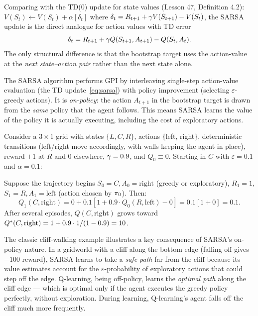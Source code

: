 \documentclass[11pt,a4paper]{article}
\begin{document}
\begin{remark}
\label{rem:sarsa_td}
Comparing with the TD(0) update for state values
(Lesson 47, Definition 4.2):
$V(S_t) \leftarrow V(S_t) + \alpha[\delta_t]$ where
$\delta_t = R_{t+1} + \gamma V(S_{t+1}) - V(S_t)$,
the SARSA update is the direct analogue for action values with
TD error
\begin{equation}
  \delta_t = R_{t+1} + \gamma Q(S_{t+1}, A_{t+1})
  - Q(S_t, A_t).
  \label{eq:sarsa_td_error}
\end{equation}
The only structural difference is that the bootstrap target uses the
action-value at the \emph{next state--action pair} rather than the
next state alone.
\end{remark}

\begin{keyresult}[title={SARSA: On-Policy TD Control}]
The SARSA algorithm performs GPI by interleaving single-step
action-value evaluation (the TD update~\eqref{eq:sarsa}) with
policy improvement (selecting $\varepsilon$-greedy actions). It is
\emph{on-policy}: the action $A_{t+1}$ in the bootstrap target is
drawn from the \emph{same} policy that the agent follows. This
means SARSA learns the value of the policy it is actually executing,
including the cost of exploratory actions.
\end{keyresult}

\begin{example}
\label{ex:sarsa_grid}
Consider a $3 \times 1$ grid with states $\{L, C, R\}$, actions
$\{$left, right$\}$, deterministic transitions (left/right move
accordingly, with walls keeping the agent in place), reward $+1$ at
$R$ and $0$ elsewhere, $\gamma = 0.9$, and $Q_0 \equiv 0$.
Starting in $C$ with $\varepsilon = 0.1$ and $\alpha = 0.1$:

Suppose the trajectory begins $S_0 = C, A_0 = \text{right}$ (greedy
or exploratory), $R_1 = 1$, $S_1 = R, A_1 = \text{left}$ (action
chosen by $\pi_0$). Then:
\[
  Q_1(C, \text{right}) = 0 + 0.1[1 + 0.9 \cdot Q_0(R, \text{left})
  - 0] = 0.1[1 + 0] = 0.1.
\]
After several episodes, $Q(C, \text{right})$ grows toward
$Q^*(C, \text{right}) = 1 + 0.9 \cdot 1/(1-0.9) = 10$.
\end{example}

\begin{rlconnection}[title={On-Policy Safety in Cliff Walking}]
The classic cliff-walking example
\citep[Section 6.5]{suttonbarto2018} illustrates a key consequence
of SARSA's on-policy nature. In a gridworld with a cliff along the
bottom edge (falling off gives $-100$ reward), SARSA learns to take
a \emph{safe path} far from the cliff because its value estimates
account for the $\varepsilon$-probability of exploratory actions
that could step off the edge. Q-learning, being off-policy, learns
the \emph{optimal path} along the cliff edge --- which is optimal
only if the agent executes the greedy policy perfectly, without
exploration. During learning, Q-learning's agent falls off the cliff
much more frequently.
\end{rlconnection}
\end{document}
